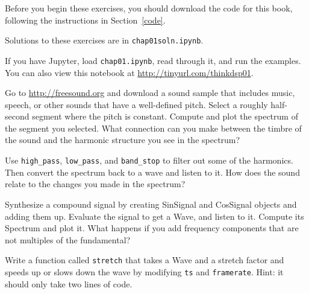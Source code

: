 Before you begin these exercises, you should download the code
for this book, following the instructions in Section~\ref{code}.

Solutions to these exercises are in {\tt chap01soln.ipynb}.

\begin{exercise}
	If you have Jupyter, load {\tt chap01.ipynb}, read through it, and run
	the examples.  You can also view this notebook at
	\url{http://tinyurl.com/thinkdsp01}.
\end{exercise}


\begin{exercise}
	Go to \url{http://freesound.org} and download a sound sample that
	includes music, speech, or other sounds that have a well-defined pitch.
	Select a roughly half-second segment where the pitch is
	constant.  Compute and plot the spectrum of the segment you selected.
	What connection can you make between the timbre of the sound and the
	harmonic structure you see in the spectrum?
	
	Use \verb"high_pass", \verb"low_pass", and \verb"band_stop" to
	filter out some of the harmonics.  Then convert the spectrum back
	to a wave and listen to it.  How does the sound relate to the
	changes you made in the spectrum?
\end{exercise}


\begin{exercise}
	Synthesize a compound signal by creating SinSignal and CosSignal
	objects and adding them up.  Evaluate the signal to get a Wave,
	and listen to it.  Compute its Spectrum and plot it.
	What happens if you add frequency
	components that are not multiples of the fundamental?
\end{exercise}


\begin{exercise}
	Write a function called {\tt stretch} that takes a Wave and a stretch
	factor and speeds up or slows down the wave by modifying {\tt ts} and
	{\tt framerate}.  Hint: it should only take two lines of code.
\end{exercise}
